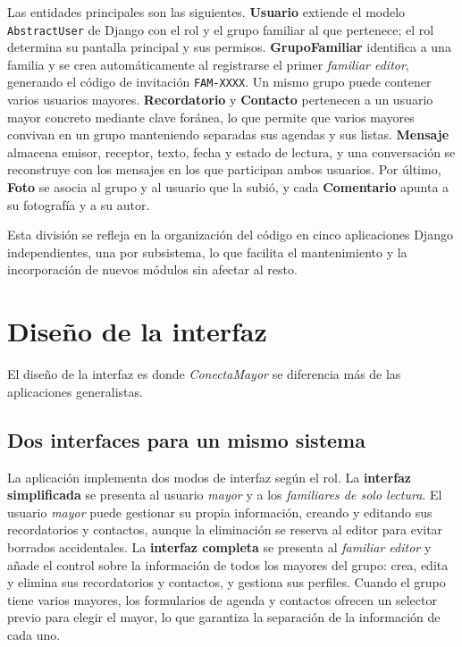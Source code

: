 Las entidades principales son las siguientes. \textbf{Usuario} extiende
el modelo \texttt{AbstractUser} de Django con el rol y el grupo familiar
al que pertenece; el rol determina su pantalla principal y sus permisos.
\textbf{GrupoFamiliar} identifica a una familia y se crea automáticamente
al registrarse el primer \emph{familiar editor}, generando el código de
invitación \texttt{FAM-XXXX}. Un mismo grupo puede contener varios usuarios
mayores. \textbf{Recordatorio} y \textbf{Contacto} pertenecen a un usuario
mayor concreto mediante clave foránea, lo que permite que varios mayores
convivan en un grupo manteniendo separadas sus agendas y sus listas.
\textbf{Mensaje} almacena emisor, receptor, texto, fecha y estado de
lectura, y una conversación se reconstruye con los mensajes en los que
participan ambos usuarios. Por último, \textbf{Foto} se asocia al grupo y
al usuario que la subió, y cada \textbf{Comentario} apunta a su fotografía
y a su autor.

Esta división se refleja en la organización del código en cinco
aplicaciones Django independientes, una por subsistema, lo que facilita el
mantenimiento y la incorporación de nuevos módulos sin afectar al resto.


\section{Diseño de la interfaz\label{SEC:DIS_INTERFAZ}}

El diseño de la interfaz es donde \emph{ConectaMayor} se diferencia más de las aplicaciones generalistas.

\subsection{Dos interfaces para un mismo sistema\label{SUB:DIS_DOS_INTERFACES}}

La aplicación implementa dos modos de interfaz según el rol. La
\textbf{interfaz simplificada} se presenta al usuario \emph{mayor} y a los
\emph{familiares de solo lectura}. El
usuario \emph{mayor} puede gestionar su propia información, creando y
editando sus recordatorios y contactos, aunque la eliminación se reserva al
editor para evitar borrados accidentales. La \textbf{interfaz completa} se
presenta al \emph{familiar editor} y añade el control sobre la información
de todos los mayores del grupo: crea, edita y elimina sus recordatorios y
contactos, y gestiona sus perfiles. Cuando el grupo tiene varios mayores,
los formularios de agenda y contactos ofrecen un selector previo para
elegir el mayor, lo que garantiza la separación de la
información de cada uno.

